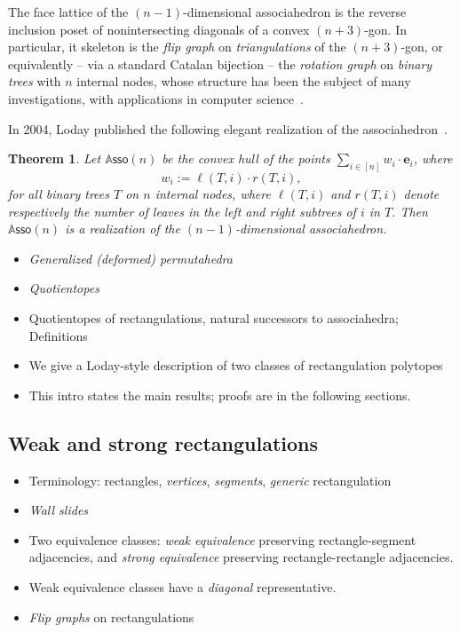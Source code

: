 \documentclass{amsart}
\newtheorem{theorem}{Theorem}%
\theoremstyle{definition}
\newcommand{\darkblue}{\color{darkblue}} %
\newcommand{\defn}[1]{\textsl{\darkblue #1}} %
\newcommand{\polytope}[1]{\mathds{#1}} %
\newcommand{\Asso}{\polytope{A}\mathsf{sso}} %
\begin{document}
The face lattice of the $(n-1)$-dimensional associahedron is the reverse inclusion poset of nonintersecting diagonals of a convex $(n+3)$-gon. In particular, it skeleton is the \defn{flip graph} on \defn{triangulations} of the $(n+3)$-gon, or equivalently -- via a standard Catalan bijection -- the \defn{rotation graph} on \defn{binary trees} with $n$ internal nodes, whose structure has been the subject of many investigations, with applications in computer science~\cite{}.

In 2004, Loday published the following elegant realization of the associahedron~\cite{}.

\begin{theorem}
  Let $\Asso (n)$ be the convex hull of the points
  $\sum_{i\in [n]} w_i\cdot \mathbf{e}_i$, where
  \[
  w_i := \ell(T, i)\cdot r(T,i),
  \]
  for all binary trees $T$ on $n$ internal nodes, where $\ell(T,i)$ and $r(T,i)$ denote respectively the number of leaves in the left and right subtrees of $i$ in $T$.
  Then $\Asso (n)$ is a realization of the $(n-1)$-dimensional associahedron.
\end{theorem}


\begin{itemize}
\item \defn{Generalized (deformed) permutahedra}
\item \defn{Quotientopes}
\item Quotientopes of rectangulations, natural successors to associahedra; Definitions
\item We give a Loday-style description of two classes of rectangulation polytopes
\item This intro states the main results; proofs are in the following sections.
\end{itemize}

\subsection{Weak and strong rectangulations}

\begin{itemize}
\item Terminology: rectangles, \defn{vertices}, \defn{segments}, \defn{generic} rectangulation
\item \defn{Wall slides}
\item Two equivalence classes: \defn{weak equivalence} preserving rectangle-segment adjacencies, and \defn{strong equivalence} preserving rectangle-rectangle adjacencies.
\item Weak equivalence classes have a \defn{diagonal} representative.
\item \defn{Flip graphs} on rectangulations
\end{itemize}
\end{document}
